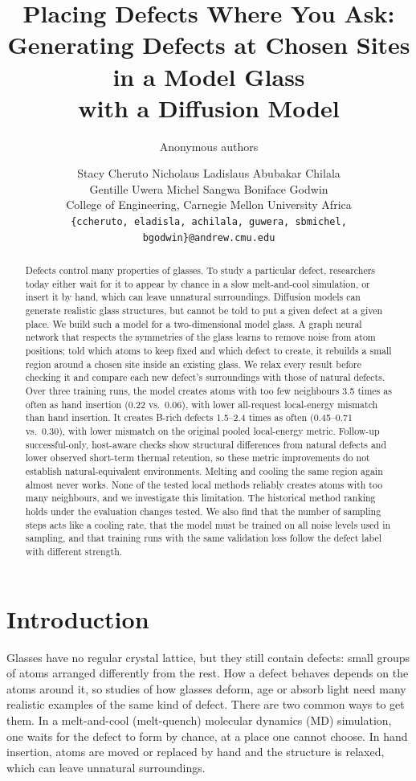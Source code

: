 \documentclass[10pt]{article}
\title{Placing Defects Where You Ask:\\ Generating Defects at Chosen Sites in a Model Glass\\ with a Diffusion Model}
\author{Anonymous authors}
\author{
  Stacy Cheruto \quad Nicholaus Ladislaus \quad Abubakar Chilala\\ Gentille Uwera \quad Michel Sangwa \quad Boniface Godwin\\[2pt]
  College of Engineering, Carnegie Mellon University Africa\\
  {\small\texttt{\{ccheruto, eladisla, achilala, guwera, sbmichel, bgodwin\}@andrew.cmu.edu}}
}
\date{}
\begin{document}
\maketitle

\begin{abstract}
Defects control many properties of glasses. To study a particular defect, researchers today either wait for it to appear by chance in a slow melt-and-cool simulation, or insert it by hand, which can leave unnatural surroundings. Diffusion models can generate realistic glass structures, but cannot be told to put a given defect at a given place. We build such a model for a two-dimensional model glass. A graph neural network that respects the symmetries of the glass learns to remove noise from atom positions; told which atoms to keep fixed and which defect to create, it rebuilds a small region around a chosen site inside an existing glass. We relax every result before checking it and compare each new defect's surroundings with those of natural defects. Over three training runs, the model creates atoms with too few neighbours 3.5 times as often as hand insertion (0.22 vs.\ 0.06), with lower all-request local-energy mismatch than hand insertion. It creates B-rich defects 1.5--2.4 times as often (0.45--0.71 vs.\ 0.30), with lower mismatch on the original pooled local-energy metric. Follow-up successful-only, host-aware checks show structural differences from natural defects and lower observed short-term thermal retention, so these metric improvements do not establish natural-equivalent environments. Melting and cooling the same region again almost never works. None of the tested local methods reliably creates atoms with too many neighbours, and we investigate this limitation. The historical method ranking holds under the evaluation changes tested. We also find that the number of sampling steps acts like a cooling rate, that the model must be trained on all noise levels used in sampling, and that training runs with the same validation loss follow the defect label with different strength.
\end{abstract}

\section{Introduction}

Glasses have no regular crystal lattice, but they still contain defects: small groups of atoms arranged differently from the rest. How a defect behaves depends on the atoms around it, so studies of how glasses deform, age or absorb light need many realistic examples of the same kind of defect. There are two common ways to get them. In a melt-and-cool (melt-quench) molecular dynamics (MD) simulation, one waits for the defect to form by chance, at a place one cannot choose. In hand insertion, atoms are moved or replaced by hand and the structure is relaxed, which can leave unnatural surroundings.
\end{document}
